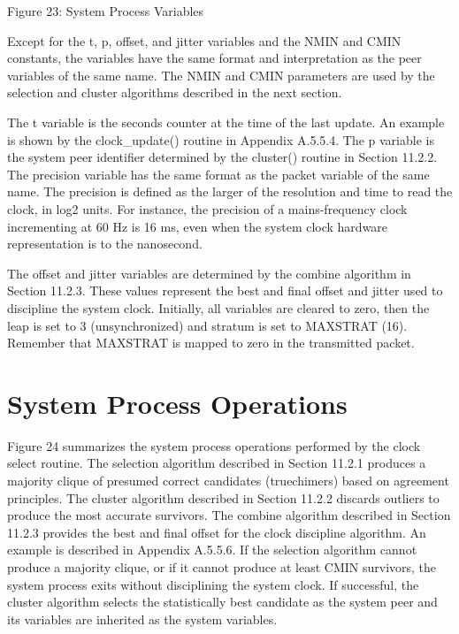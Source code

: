                 Figure 23: System Process Variables

Except for the t, p, offset, and jitter variables and the NMIN and
CMIN constants, the variables have the same format and interpretation
as the peer variables of the same name.  The NMIN and CMIN parameters
are used by the selection and cluster algorithms described in the
next section.

The t variable is the seconds counter at the time of the last update.
An example is shown by the clock\_update() routine in
Appendix A.5.5.4.  The p variable is the system peer identifier
determined by the cluster() routine in Section 11.2.2.  The precision
variable has the same format as the packet variable of the same name.
The precision is defined as the larger of the resolution and time to
read the clock, in log2 units.  For instance, the precision of a
mains-frequency clock incrementing at 60 Hz is 16 ms, even when the
system clock hardware representation is to the nanosecond.

The offset and jitter variables are determined by the combine
algorithm in Section 11.2.3.  These values represent the best and
final offset and jitter used to discipline the system clock.
Initially, all variables are cleared to zero, then the leap is set to
3 (unsynchronized) and stratum is set to MAXSTRAT (16).  Remember
that MAXSTRAT is mapped to zero in the transmitted packet.

\section{System Process Operations}

Figure 24 summarizes the system process operations performed by the
clock select routine.  The selection algorithm described in
Section 11.2.1 produces a majority clique of presumed correct
candidates (truechimers) based on agreement principles.  The cluster
algorithm described in Section 11.2.2 discards outliers to produce
the most accurate survivors.  The combine algorithm described in
Section 11.2.3 provides the best and final offset for the clock
discipline algorithm.  An example is described in Appendix A.5.5.6.
If the selection algorithm cannot produce a majority clique, or if it
cannot produce at least CMIN survivors, the system process exits
without disciplining the system clock.  If successful, the cluster
algorithm selects the statistically best candidate as the system peer
and its variables are inherited as the system variables.


